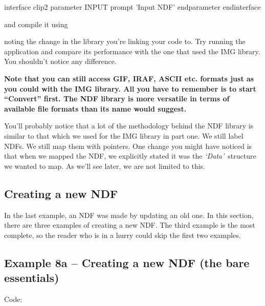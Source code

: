 \documentclass[11pt,nolof]{starlink}
\begin{document}
\begin{small}
\begin{terminalv}
interface clip2
   parameter INPUT
      prompt 'Input NDF'
   endparameter
endinterface
\end{terminalv}
\end{small}

and compile it using

\begin{small}
\begin{terminalv}
\end{terminalv}
\end{small}

noting the change in the library you're linking your code to. Try running
the application and compare its performance with the one that used the IMG
library. You shouldn't notice any difference.

\textbf{Note that you can still access GIF, IRAF, ASCII etc. formats just as
you could with the IMG library. All you have to remember is to start
``Convert'' first. The NDF library is more versatile in terms of available
file formats than its name would suggest.}

You'll probably notice that a lot of the methodology behind the
NDF library is similar to that which we used for the IMG library in part one.
We still label NDFs. We still map them with pointers. One change you
might have noticed is that when we mapped the NDF, we explicitly stated
it was the \emph{`Data'}\, structure we wanted to map. As we'll see
later, we are not limited to this.

\subsection{Creating a new NDF}

In the last example, an NDF was made by updating an old one. In this
section, there are three examples of creating a new NDF. The third
example is the most complete, so the reader who is in a hurry could
skip the first two examples.

\subsection{Example 8a -- Creating a new NDF (the bare essentials)}

Code:
\end{document}
